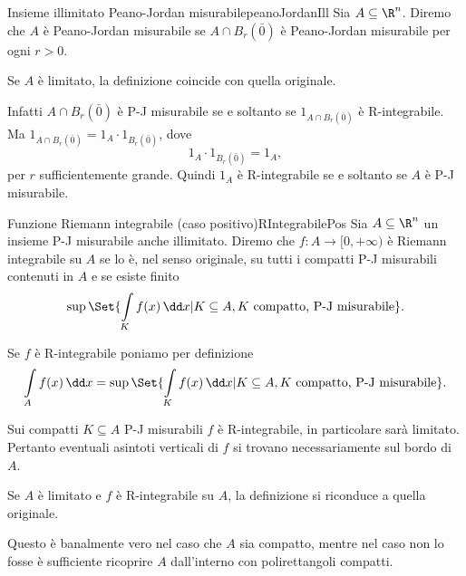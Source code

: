 \begin{defn}{Insieme illimitato Peano-Jordan misurabile}{peanoJordanIll}
	Sia \(A\subseteq \R^n\).
	Diremo che \(A\) è Peano-Jordan misurabile se \(A \cap B_r(\bar{0})\) è Peano-Jordan misurabile per ogni \(r>0\).
\end{defn}

\begin{oss}
	Se \(A\) è limitato, la definizione coincide con quella originale.

	Infatti \(A \cap B_r(\bar{0})\) è P-J misurabile se e soltanto se \(1_{A\cap B_r(\bar{0})}\) è R-integrabile.
	Ma \(1_{A\cap B_r(\bar{0})}=1_A \cdot 1_{B_r(\bar{0})}\), dove
	\[
		1_A \cdot 1_{B_r(\bar{0})} = 1_A,
	\]
	per \(r\) sufficientemente grande.
	Quindi \(1_A\) è R-integrabile se e soltanto se \(A\) è P-J misurabile.
\end{oss}

\begin{defn}{Funzione Riemann integrabile (caso positivo)}{RIntegrabilePos}
	Sia \(A\subseteq \R^n\) un insieme P-J misurabile anche illimitato.
	Diremo che \(f\colon A\to[0,+\infty)\) è Riemann integrabile su \(A\) se lo è, nel senso originale, su tutti i compatti P-J misurabili contenuti in \(A\) e se esiste finito
	\[
		\sup\Set{\int\limits_K f(x)\,\dd x | K\subseteq A, K\text{ compatto, P-J misurabile}}.
	\]
\end{defn}

\begin{notz}
	Se \(f\) è R-integrabile poniamo per definizione
	\[
		\int\limits_A f(x)\,\dd x = \sup\Set{\int\limits_K f(x)\,\dd x | K\subseteq A, K\text{ compatto, P-J misurabile}}.
	\]
\end{notz}

\begin{oss}
	Sui compatti \(K\subseteq A\) P-J misurabili \(f\) è R-integrabile, in particolare sarà limitato.
	Pertanto eventuali asintoti verticali di \(f\) si trovano necessariamente sul bordo di \(A\).
\end{oss}

\begin{oss}
	Se \(A\) è limitato e \(f\) è R-integrabile su \(A\), la definizione si riconduce a quella originale.

	Questo è banalmente vero nel caso che \(A\) sia compatto, mentre nel caso non lo fosse è sufficiente ricoprire \(A\) dall'interno con polirettangoli compatti.
\end{oss}

